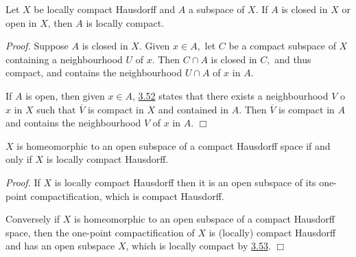 \begin{corollary}\label{3.53}
    Let $X$ be locally compact Hausdorff and $A$ a subspace of $X.$ If $A$ is closed in $X$ or open in $X$, then $A$ is locally compact.
\end{corollary}
{\it Proof.} Suppose $A$ is closed in $X.$ Given $x\in A,$ let $C$ be a compact subspace of $X$ containing a neighbourhood $U$ of $x.$ Then $C \cap A$ is closed in $C,$ and thus compact, and contains the neighbourhood $U \cap A$ of $x$ in $A.$

If $A$ is open, then given $x \in A$, \hyperref[3.52]{3.52} states that there exists a neighbourhood $V$ o $x$ in $X$ such that $\overline{V}$ is compact in $X$ and contained in $A.$ Then $\overline{V}$ is compact in $A$ and contains the neighbourhood $V$ of $x$ in $A.$ $\Box$

\begin{corollary}\label{3.54}
    $X$ is homeomorphic to an open subspace of a compact Hausdorff space if and only if $X$ is locally compact Hausdorff.
\end{corollary}
{\it Proof.} If $X$ is locally compact Hausdorff then it is an open subspace of its one-point compactification, which is compact Hausdorff.

Conversely if $X$ is homeomorphic to an open subspace of a compact Hausdorff space, then the one-point compactification of $X$ is (locally) compact Hausdorff and has an open subspace $X$, which is locally compact by \hyperref[3.53]{3.53}. $\Box$